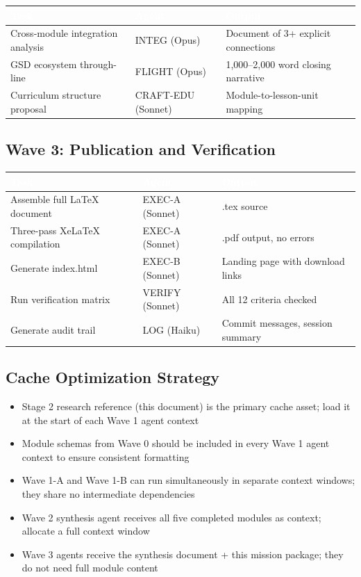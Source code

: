 \documentclass[11pt,letterpaper]{article}
\newcommand{\tableheader}[1]{\textbf{\sffamily\textcolor{white}{#1}}}
\begin{document}
\begin{center}
\begin{tabularx}{\textwidth}{L{4cm}C{2cm}X}
\toprule
{}
\tableheader{Task} & \tableheader{Agent} & \tableheader{Output} \\
\midrule
Cross-module integration analysis & INTEG (Opus) & Document of 3+ explicit connections \\
GSD ecosystem through-line & FLIGHT (Opus) & 1,000--2,000 word closing narrative \\
Curriculum structure proposal & CRAFT-EDU (Sonnet) & Module-to-lesson-unit mapping \\
\bottomrule
\end{tabularx}
\end{center}

\subsection{Wave 3: Publication and Verification}

\begin{center}
\begin{tabularx}{\textwidth}{L{4cm}C{2cm}X}
\toprule
{}
\tableheader{Task} & \tableheader{Agent} & \tableheader{Output} \\
\midrule
Assemble full LaTeX document & EXEC-A (Sonnet) & .tex source \\
Three-pass XeLaTeX compilation & EXEC-A (Sonnet) & .pdf output, no errors \\
Generate index.html & EXEC-B (Sonnet) & Landing page with download links \\
Run verification matrix & VERIFY (Sonnet) & All 12 criteria checked \\
Generate audit trail & LOG (Haiku) & Commit messages, session summary \\
\bottomrule
\end{tabularx}
\end{center}

\subsection{Cache Optimization Strategy}

\begin{itemize}[leftmargin=1.5em]
  \item Stage 2 research reference (this document) is the primary cache asset; load it at the start of each Wave 1 agent context
  \item Module schemas from Wave 0 should be included in every Wave 1 agent context to ensure consistent formatting
  \item Wave 1-A and Wave 1-B can run simultaneously in separate context windows; they share no intermediate dependencies
  \item Wave 2 synthesis agent receives all five completed modules as context; allocate a full context window
  \item Wave 3 agents receive the synthesis document + this mission package; they do not need full module content
\end{itemize}
\end{document}
